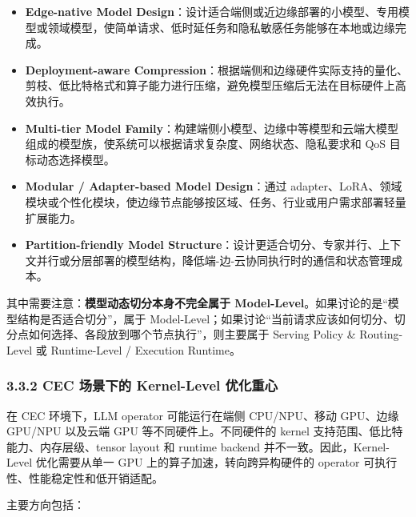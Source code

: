 \documentclass[a4paper,twocolumn,10pt]{ctexart}
\begin{document}
\begin{itemize}
\item \textbf{Edge-native Model Design}：设计适合端侧或近边缘部署的小模型、专用模型或领域模型，使简单请求、低时延任务和隐私敏感任务能够在本地或边缘完成。

\item \textbf{Deployment-aware Compression}：根据端侧和边缘硬件实际支持的量化、剪枝、低比特格式和算子能力进行压缩，避免模型压缩后无法在目标硬件上高效执行。

\item \textbf{Multi-tier Model Family}：构建端侧小模型、边缘中等模型和云端大模型组成的模型族，使系统可以根据请求复杂度、网络状态、隐私要求和 QoS 目标动态选择模型。

\item \textbf{Modular / Adapter-based Model Design}：通过 adapter、LoRA、领域模块或个性化模块，使边缘节点能够按区域、任务、行业或用户需求部署轻量扩展能力。

\item \textbf{Partition-friendly Model Structure}：设计更适合切分、专家并行、上下文并行或分层部署的模型结构，降低端-边-云协同执行时的通信和状态管理成本。



\end{itemize}
其中需要注意：\textbf{模型动态切分本身不完全属于 Model-Level}。如果讨论的是“模型结构是否适合切分”，属于 Model-Level；如果讨论“当前请求应该如何切分、切分点如何选择、各段放到哪个节点执行”，则主要属于 Serving Policy \& Routing-Level 或 Runtime-Level / Execution Runtime。








\subsubsection{3.3.2 CEC 场景下的 Kernel-Level 优化重心}



在 CEC 环境下，LLM operator 可能运行在端侧 CPU/NPU、移动 GPU、边缘 GPU/NPU 以及云端 GPU 等不同硬件上。不同硬件的 kernel 支持范围、低比特能力、内存层级、tensor layout 和 runtime backend 并不一致。因此，Kernel-Level 优化需要从单一 GPU 上的算子加速，转向跨异构硬件的 operator 可执行性、性能稳定性和低开销适配。




主要方向包括：
\end{document}
